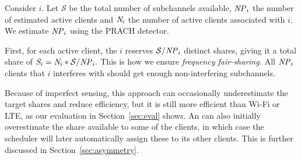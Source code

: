 

Consider \eNB $i$. Let $\mathcal{S}$ be the total number of subchannels available, 
$\id{NP}_i$ the number of estimated active clients and 
$\id{N}_i$ the number of active clients associated with \eNB $i$. 
We estimate $\id{NP}_i$ using the PRACH detector.


First, for each active client, the \eNB $i$ reserves 
$\mathcal{S} / \id{NP}_i$ 
distinct shares, giving it a total share of 
$\id{S}_i =  \id{N}_i * \mathcal{S} / \id{NP}_i.$ 
This is how we ensure \emph{frequency fair-sharing.} All $\id{NP}_i$ clients that \eNB $i$ interferes with should get enough non-interfering subchannels. 

Because of imperfect sensing, this approach can occasionally underestimate the target shares and reduce efficiency, but it is still more efficient than Wi-Fi or LTE, as our evaluation in Section~\ref{sec:eval} shows. An \eNB can also initially overestimate the share available to some of the clients, in which case the scheduler will later automatically assign these to its other clients. This is further discussed in Section~\ref{sec:asymmetry}.








